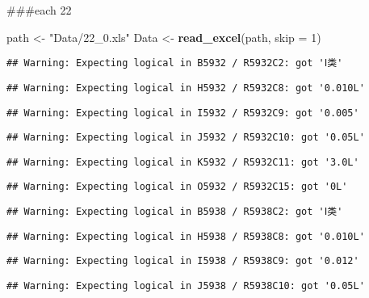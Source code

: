\documentclass[
]{article}
\newenvironment{Shaded}{\begin{snugshade}}{\end{snugshade}}
\newcommand{\AttributeTok}[1]{\textcolor[rgb]{0.13,0.29,0.53}{#1}}
\newcommand{\DecValTok}[1]{\textcolor[rgb]{0.00,0.00,0.81}{#1}}
\newcommand{\FunctionTok}[1]{\textcolor[rgb]{0.13,0.29,0.53}{\textbf{#1}}}
\newcommand{\NormalTok}[1]{#1}
\newcommand{\OtherTok}[1]{\textcolor[rgb]{0.56,0.35,0.01}{#1}}
\newcommand{\StringTok}[1]{\textcolor[rgb]{0.31,0.60,0.02}{#1}}
\begin{document}
\#\#\#each 22

\begin{Shaded}
\begin{Highlighting}[]
\NormalTok{path }\OtherTok{\textless{}{-}} \StringTok{"Data/22\_0.xls"}
\NormalTok{Data }\OtherTok{\textless{}{-}} \FunctionTok{read\_excel}\NormalTok{(path, }\AttributeTok{skip =} \DecValTok{1}\NormalTok{)}
\end{Highlighting}
\end{Shaded}

\begin{verbatim}
## Warning: Expecting logical in B5932 / R5932C2: got 'Ⅰ类'
\end{verbatim}

\begin{verbatim}
## Warning: Expecting logical in H5932 / R5932C8: got '0.010L'
\end{verbatim}

\begin{verbatim}
## Warning: Expecting logical in I5932 / R5932C9: got '0.005'
\end{verbatim}

\begin{verbatim}
## Warning: Expecting logical in J5932 / R5932C10: got '0.05L'
\end{verbatim}

\begin{verbatim}
## Warning: Expecting logical in K5932 / R5932C11: got '3.0L'
\end{verbatim}

\begin{verbatim}
## Warning: Expecting logical in O5932 / R5932C15: got '0L'
\end{verbatim}

\begin{verbatim}
## Warning: Expecting logical in B5938 / R5938C2: got 'Ⅰ类'
\end{verbatim}

\begin{verbatim}
## Warning: Expecting logical in H5938 / R5938C8: got '0.010L'
\end{verbatim}

\begin{verbatim}
## Warning: Expecting logical in I5938 / R5938C9: got '0.012'
\end{verbatim}

\begin{verbatim}
## Warning: Expecting logical in J5938 / R5938C10: got '0.05L'
\end{verbatim}
\end{document}
